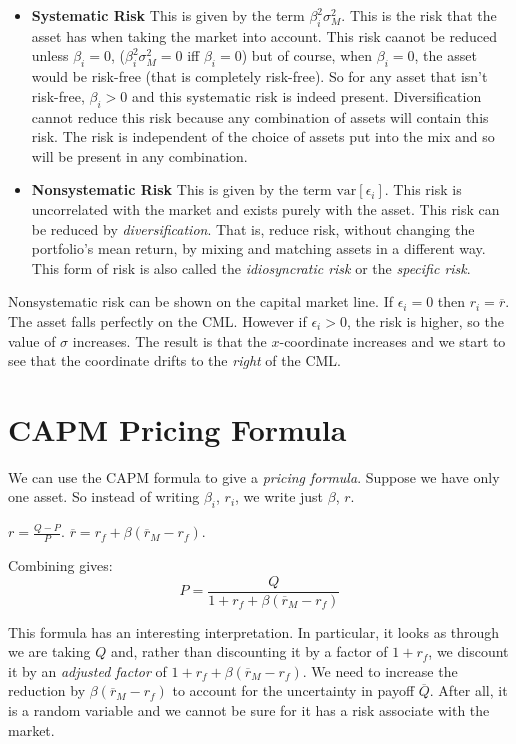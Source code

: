 \begin{itemize}
\item \textbf{Systematic Risk}
This is given by the term $ \beta_i^2 \sigma^2_M$. 
This is the risk that the asset has when taking the market into account. 
This risk caanot be reduced unless $\beta_i = 0$, ($\beta^2_i \sigma^2_M = 0$ iff $\beta_i = 0$)
but of course, when $\beta_i = 0$, the asset would be risk-free (that is completely risk-free). 
So for any asset that isn't risk-free, $\beta_i > 0$ and this systematic risk is indeed present. 
Diversification cannot reduce this risk because any combination of assets will contain this risk. 
The risk is independent of the choice of assets put into the mix and so will be present
in any combination. 
\item \textbf{Nonsystematic Risk} 
This is given by the term $ \text{var}[\epsilon_i]$. 
This risk is uncorrelated with the market and exists purely with the asset. 
This risk can be reduced by \textit{diversification}. That is, reduce 
risk, without changing the portfolio's mean return, by mixing and matching 
assets in a different way. This form of risk is also called the
\textit{idiosyncratic risk} or the \textit{specific risk}. 
\end{itemize}

Nonsystematic risk can be shown on the capital market line. 
If $\epsilon_i = 0$ then $r_i = \overline{r}$. The asset 
falls perfectly on the CML. However if $\epsilon_i > 0$, the risk is higher, so the 
value of $\sigma$ increases. The result is that the 
$x$-coordinate increases and we start to see that
the coordinate drifts to the \textit{right} of the CML. 

\section{CAPM Pricing Formula}

We can use the CAPM formula to give a \textit{pricing formula}. 
Suppose we have only one asset. So instead of writing $\beta_i$, $r_i$, 
we write just $\beta$, $r$.

$r = \frac{Q-P}{P}$. 
$\overline{r} = r_f + \beta(\overline{r}_M - r_f)$. 

Combining gives:
$$P = \frac{Q}{1 + r_f + \beta(\overline{r}_M-r_f)}$$

This formula has an interesting interpretation. 
In particular, it looks as through we are taking $Q$ 
and, rather than discounting it by a factor of $1 + r_f$, 
we discount it by an \textit{adjusted factor} of 
$1 + r_f + \beta(\overline{r}_M-r_f)$. 
We need to increase the reduction by $\beta(\overline{r}_M-r_f)$
to account for the uncertainty in payoff $\overline{Q}$. 
After all, it is a random variable and we cannot be sure
for it has a risk associate with the market. 

